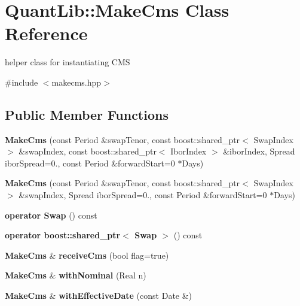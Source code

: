\section{Quant\+Lib\+:\+:Make\+Cms Class Reference}
\label{class_quant_lib_1_1_make_cms}


helper class for instantiating C\+MS  




{\ttfamily \#include $<$makecms.\+hpp$>$}

\subsection*{Public Member Functions}
\begin{DoxyCompactItemize}
\item 
{\bfseries Make\+Cms} (const Period \&swap\+Tenor, const boost\+::shared\+\_\+ptr$<$ Swap\+Index $>$ \&swap\+Index, const boost\+::shared\+\_\+ptr$<$ Ibor\+Index $>$ \&ibor\+Index, Spread ibor\+Spread=0., const Period \&forward\+Start=0 $\ast$Days)\label{class_quant_lib_1_1_make_cms_acbba31d4c2a11c1b3f0387b1535ea46c}

\item 
{\bfseries Make\+Cms} (const Period \&swap\+Tenor, const boost\+::shared\+\_\+ptr$<$ Swap\+Index $>$ \&swap\+Index, Spread ibor\+Spread=0., const Period \&forward\+Start=0 $\ast$Days)\label{class_quant_lib_1_1_make_cms_ac8146fea94182ff243d9db7f6ae0400c}

\item 
{\bfseries operator Swap} () const \label{class_quant_lib_1_1_make_cms_ac3df600dc389e7846b73fdb57ff5de75}

\item 
{\bfseries operator boost\+::shared\+\_\+ptr$<$ Swap $>$} () const \label{class_quant_lib_1_1_make_cms_a413d6a37a19b4b33d078e621039a5686}

\item 
{\bf Make\+Cms} \& {\bfseries receive\+Cms} (bool flag=true)\label{class_quant_lib_1_1_make_cms_a0c0c3933de4c7bc0b32b6095a8fd4ca2}

\item 
{\bf Make\+Cms} \& {\bfseries with\+Nominal} (Real n)\label{class_quant_lib_1_1_make_cms_a8fa502ceaca8162629ec3a1809d69500}

\item 
{\bf Make\+Cms} \& {\bfseries with\+Effective\+Date} (const Date \&)\label{class_quant_lib_1_1_make_cms_a02792823771328689388b64ea7ef05e2}


\end{DoxyCompactItemize}
